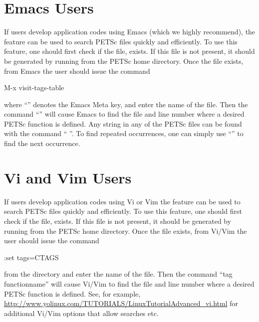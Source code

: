 {{{\section{Emacs Users}  \label{sec_emacs}

 
If users develop application codes  using Emacs (which we
highly recommend), the  feature can be used to search PETSc 
files quickly and efficiently.  To use this feature, one should 
first check if the file,
 exists.  If this file is
not present, it should be generated by
running   from the PETSc home directory. 
Once the file exists, from 
Emacs the user should issue
the command 
\begin{tabbing}
 M-x visit-tags-table
\end{tabbing}
 where ``''
denotes the Emacs Meta key, and enter the 
name of the  file. Then the command ``'' will cause Emacs 
to find the file and line number where a desired PETSc function 
is defined.  Any string in any of the PETSc files can be found with the 
command `` ''. To find repeated occurrences, 
one can simply use ``'' to find the next occurrence.

\section{Vi and Vim Users}   

If users develop application codes  using Vi or Vim the  feature can be used to search PETSc 
files quickly and efficiently.  To use this feature, one should 
first check if the file,
 exists.  If this file is
not present, it should be generated by
running   from the PETSc home directory. 
Once the file exists, from 
Vi/Vim the user should issue
the command 
\begin{tabbing}
:set tags=CTAGS
\end{tabbing}
from the  directory and enter the 
name of the  file. Then the command ``tag functionname'' will cause Vi/Vim
to find the file and line number where a desired PETSc function 
is defined.  See, for example, \href{http://www.yolinux.com/TUTORIALS/LinuxTutorialAdvanced_vi.html}{http://www.yolinux.com/TUTORIALS/LinuxTutorialAdvanced\_vi.html} for additional Vi/Vim options that allow searches etc.

}}}
